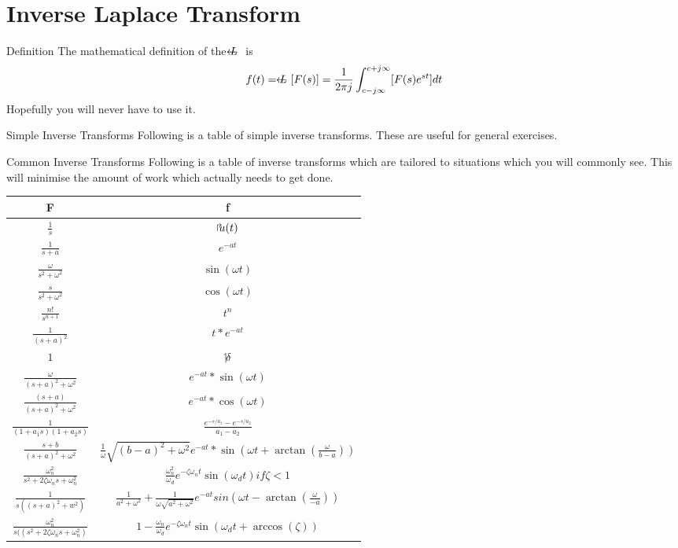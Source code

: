 \documentclass{../templates/mathtool}
\begin{document}
\chapter{Inverse Laplace Transform}

\begin{section}{Definition}
	The mathematical definition of the $\ilaplace$ is
	\begin{equation}
		f(t) = \ilaplace[F(s)] = \frac{1}{2\pi j}\int_{c-j\infty}^{c+j\infty}[F(s)e^{st}]dt
	\end{equation}
	Hopefully you will never have to use it.
\end{section}

\begin{section}{Simple Inverse Transforms}
	Following is a table of simple inverse transforms. These are useful for general exercises.
\end{section}

\begin{section}{Common Inverse Transforms}
	Following is a table of inverse transforms which are tailored to situations which you will commonly see. This will minimise the amount of work which actually needs to get done.
	
\end{section}
	\begin{tabular}{|c|c|}
		\hline
		F & f \\
		\hline \hline
		$\frac{1}{s}$ & $\ustep(t)$ \\
			\hline
		$\frac{1}{s+a}$ & $e^{-at}$ \\
			\hline
		$\frac{\omega}{s^2+\omega^2}$ & $\sin{(\omega t)}$ \\
			\hline
		$\frac{s}{s^2+\omega^2}$ & $\cos{(\omega t)}$ \\
			\hline
		$\frac{n!}{s^{n+1}}$ & $t^n$ \\
			\hline
		$\frac{1}{(s+a)^2}$ & $t*e^{-at}$ \\
			\hline
		$1$ & $\impulse$ \\
			\hline
		$\frac{\omega}{(s+a)^2+\omega^2}$ & $e^{-at}*\sin{(\omega t)}$ \\
			\hline
		$\frac{(s+a)}{(s+a)^2+\omega^2}$ & $e^{-at}*\cos{(\omega t)}$ \\
			\hline
		$\frac{1}{(1+a_1s)(1+a_2s)}$ & $\frac{e^{-s/a_1}-e^{-s/a_2}}{a_1-a_2}$ \\
			\hline
		$\frac{s+b}{(s+a)^2+\omega^2}$ & $\frac{1}{\omega}\sqrt{(b-a)^2+\omega^2} e^{-at}*\sin{(\omega t+\arctan(\frac{\omega}{b-a}))}$ \\
			\hline
		$\frac{\omega_n^2}{s^2+2\zeta\omega_n s+\omega_n^2}$ & $\frac{\omega_n^2}{\omega_d}e^{-\zeta\omega_n t}\sin{(\omega_d t)} if \zeta < 1$ \\
			\hline
		$\frac{1}{s((s+a)^2+w^2)}$ & $\frac{1}{a^2+\omega^2}+\frac{1}{\omega\sqrt{a^2+\omega^2}}e^{-at}sin{(\omega t - \arctan{(\frac{\omega}{-a})})}$ \\
			\hline
		$\frac{\omega_n^2}{s((s^2 + 2\zeta\omega_n s + \omega_n^2)}$ & $1-\frac{\omega_n}{\omega_d}e^{-\zeta\omega_n t}\sin{(\omega_d t + \arccos{(\zeta)})}$ \\
		\hline
	\end{tabular}
	
\end{document}
